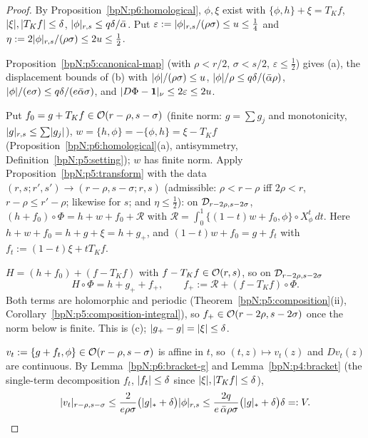 \begin{proof}
\label{stepN:p6:it-gen} By Proposition~\ref{bpN:p6:homological}, $\phi,\xi$ exist with $\{\phi,h\}+\xi=T_Kf$, $\lvert \xi\rvert,\lvert T_Kf\rvert\le\delta$, $\lvert \phi\rvert_{r,s}\le q\delta/\bar\alpha$. Put $\varepsilon:=\lvert \phi\rvert_{r,s}/(\rho\sigma)\le u\le\frac14$ and $\eta:=2\lvert \phi\rvert_{r,s}/(\rho\sigma)\le2u\le\frac12$.

\label{stepN:p6:it-map} Proposition~\ref{bpN:p5:canonical-map} (with $\rho<r/2$, $\sigma<s/2$, $\varepsilon\le\frac12$) gives (a), the displacement bounds of (b) with $\lvert \phi\rvert/(\rho\sigma)\le u$, $\lvert \phi\rvert/\rho\le q\delta/(\bar\alpha\rho)$, $\lvert \phi\rvert/(e\sigma)\le q\delta/(e\bar\alpha\sigma)$, and $\lvert D\Phi-\mathbf 1\rvert_\nu\le2\varepsilon\le2u$.

\label{stepN:p6:it-taylor} Put $f_0=g+T_Kf\in\mathcal O(r-\rho,s-\sigma)$ (finite norm: $g=\sum g_j$ and monotonicity, $\lvert g\rvert_{r,s}\le\sum\lvert g_j\rvert$), $w=\{h,\phi\}=-\{\phi,h\}=\xi-T_Kf$ (Proposition~\ref{bpN:p6:homological}(a), antisymmetry, Definition~\ref{bpN:p5:setting}); $w$ has finite norm. Apply Proposition~\ref{bpN:p5:transform} with the data $(r,s;r',s')\to(r-\rho,s-\sigma;r,s)$ (admissible: $\rho<r-\rho$ iff $2\rho<r$, $r-\rho\le r'-\rho$; likewise for $s$; and $\eta\le\frac12$):
on $\mathcal D_{r-2\rho,s-2\sigma}$, $(h+f_0)\circ\Phi=h+w+f_0+\mathcal R$ with $\mathcal R=\int_0^1\{(1-t)w+f_0,\phi\}\circ X^t_\phi\,dt$. Here $h+w+f_0=h+g+\xi=h+g_+$, and $(1-t)w+f_0=g+f_t$ with $f_t:=(1-t)\xi+tT_Kf$.

\label{stepN:p6:it-decomp} $H=(h+f_0)+(f-T_Kf)$ with $f-T_Kf\in\mathcal O(r,s)$, so on $\mathcal D_{r-2\rho,s-2\sigma}$
\[H\circ\Phi=h+g_++f_+,\qquad f_+:=\mathcal R+(f-T_Kf)\circ\Phi .\]
Both terms are holomorphic and periodic (Theorem~\ref{bpN:p5:composition}(ii), Corollary~\ref{bpN:p5:composition-integral}), so $f_+\in\mathcal O(r-2\rho,s-2\sigma)$ once the norm below is finite. This is (c); $\lvert g_+-g\rvert=\lvert \xi\rvert\le\delta$.

\label{stepN:p6:it-integrand} $v_t:=\{g+f_t,\phi\}\in\mathcal O(r-\rho,s-\sigma)$ is affine in $t$, so $(t,z)\mapsto v_t(z)$ and $Dv_t(z)$ are continuous. By Lemma~\ref{bpN:p6:bracket-g} and Lemma~\ref{bpN:p4:bracket} (the single-term decomposition $f_t$, $\lvert f_t\rvert\le\delta$ since $\lvert \xi\rvert,\lvert T_Kf\rvert\le\delta$),
\[\lvert v_t\rvert_{r-\rho,s-\sigma}\le\frac2{e\rho\sigma}\bigl(\lvert g\rvert_*+\delta\bigr)\lvert \phi\rvert_{r,s}\le\frac{2q}{e\,\bar\alpha\rho\sigma}\bigl(\lvert g\rvert_*+\delta\bigr)\delta=:V .\]


\end{proof}
